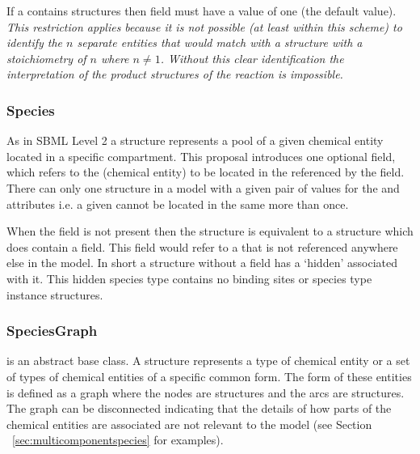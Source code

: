 \documentclass{cekarticle}
\begin{document}
If a  contains
 structures then 
field must have a value of one (the default value). \emph{This
restriction applies because it is not possible (at least within
this scheme) to identify the $n$ separate entities that would
match with a  structure with a
stoichiometry of $n$ where $n \neq 1$.  Without this clear
identification the interpretation of the product structures of the
reaction is impossible.}

\subsubsection{Species}
\label{sec:species}

As in SBML Level 2 a  structure represents a pool
of a given chemical entity located in a specific compartment. This
proposal introduces one optional  field,
 which refers to the 
(chemical entity) to be located in the 
referenced by the  field.  There can only one
 structure in a model with a given pair of values
for the  and  attributes
i.e. a given  cannot be located in the same
 more than once.

When the  field is not present then the
 structure is equivalent to a 
structure which does contain a  field. This
field would refer to a  that is not referenced
anywhere else in the model. In short a  structure
without a  field has a `hidden'
 associated with it.  This hidden species type
contains no binding sites or species type instance structures.

\subsubsection{SpeciesGraph}

 is an abstract base class. A
 structure represents a type of chemical
entity or a set of types of chemical entities of a specific common
form. The form of these entities is defined as a graph where the
nodes are  structures and the arcs are
 structures.  The graph can be disconnected indicating
that the details of how parts of the chemical entities are
associated are not relevant to the model (see Section
~\ref{sec:multicomponentspecies} for examples).
\end{document}
